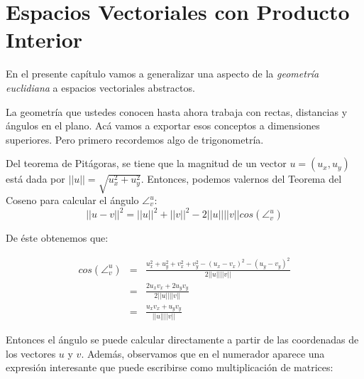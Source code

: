 \documentclass[12pt]{book}
\begin{document}
{\chapter{Espacios Vectoriales con Producto Interior}


En el presente capítulo vamos a generalizar una aspecto de la \emph{geometría euclidiana} a espacios vectoriales abstractos.

La geometría que ustedes conocen hasta ahora trabaja con rectas, distancias y ángulos en el plano. Acá vamos a exportar esos conceptos a dimensiones superiores. Pero primero recordemos algo de trigonometría.

\begin{center}
\end{center}
Del teorema de Pitágoras, se tiene que la magnitud de un vector $u=(u_x,u_y)$ está dada por $||u||=\sqrt{u_x^2+u_y^2}$.
Entonces, podemos valernos del Teorema del Coseno para calcular el ángulo $\angle^u_v$:
$$||u-v||^2=||u||^2+||v||^2-2||u|| ||v|| cos(\angle^u_v)$$

De éste obtenemos que:

\begin{eqnarray*}
  cos(\angle^u_v)&=&\frac{u_x^2+u_y^2+v_x^2+v_y^2-(u_x-v_x)^2-(u_y-v_y)^2}{2||u|| ||v|| }\\
  &=&\frac{2u_xv_x+2u_yv_y}{2||u|| ||v|| }\\
  &=&\frac{u_xv_x+u_yv_y}{||u|| ||v|| }
\end{eqnarray*}


Entonces el ángulo se puede calcular directamente a partir de las coordenadas de los vectores $u$ y $v$.
Además, observamos que en el numerador aparece una expresión interesante que puede escribirse como multiplicación de matrices:

}
\end{document}
